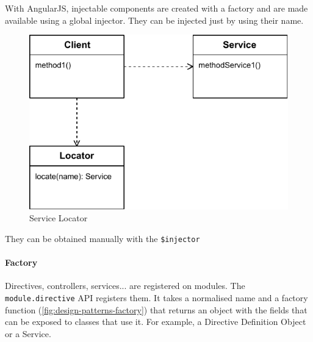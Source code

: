 With AngularJS, injectable components are created with a factory and are made available using a global injector.
They can be injected just by using their name.

\begin{figure}[htb]
    \centering
    \includegraphics{figures/design-patterns-servicelocator.pdf}
    \caption{Service Locator}
    \label{fig:design-service-locator}
\end{figure}



They can be obtained manually with the \texttt{\$injector}



\paragraph{Factory} Directives, controllers, services... are registered on modules. 
The \texttt{module.directive} \ac{API} registers them. 
It takes a normalised name and a factory function (\ref{fig:design-patterns-factory}) that returns an object with the fields that can be exposed to classes that use it.
For example, a Directive Definition Object or a Service.


